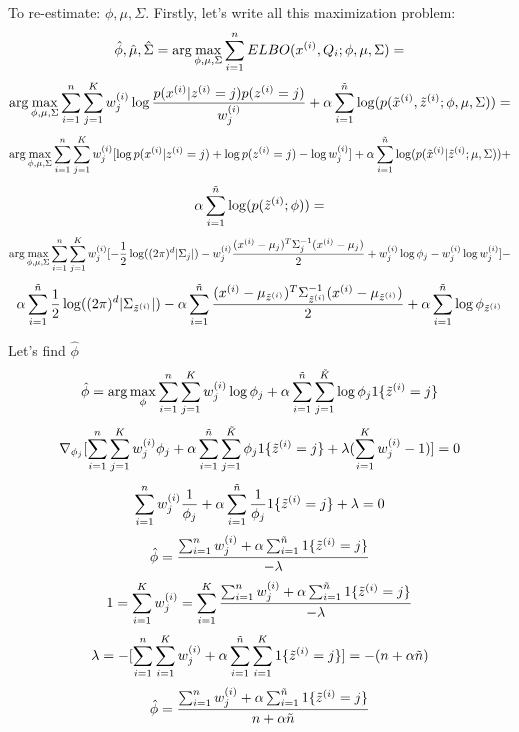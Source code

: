 \begin{answer}
To re-estimate: $\phi, \mu, \Sigma$.
Firstly, let's write all this maximization problem:
$$\hat{\phi},\hat{\mu},\hat{\Sigma} = \arg\max_{\phi, \mu, \Sigma} \sum_{i=1}^{{n}} ELBO(x^{(i)}, Q_i; \phi, \mu, \Sigma) = $$
$$ \arg\max_{\phi, \mu, \Sigma} \sum_{i=1}^{{n}} \sum_{j=1}^{K} w_j^{(i)} \log \frac{p(x^{(i)}|z^{(i)}=j)p(z^{(i)}=j)}{w_j^{(i)}} +  \alpha \sum_{i=1}^{\tilde{{n}}} \log(p(\tilde{x}^{(i)}, \tilde{z}^{(i)}; \phi, \mu, \Sigma)) = $$
$$\arg\max_{\phi, \mu, \Sigma} \sum_{i=1}^{{n}} \sum_{j=1}^{K} w_j^{(i)} [\log p(x^{(i)}|z^{(i)}=j) + \log p(z^{(i)}=j)  - \log w_j^{(i)}] +  \alpha \sum_{i=1}^{\tilde{{n}}} \log(p(\tilde{x}^{(i)} | \tilde{z}^{(i)}; \mu, \Sigma)) + $$
$$\alpha \sum_{i=1}^{\tilde{{n}}} \log(p(\tilde{z}^{(i)}; \phi)) = $$
$$\arg\max_{\phi, \mu, \Sigma} \sum_{i=1}^{{n}} \sum_{j=1}^{K} w_j^{(i)} [-\frac{1}{2}\log((2\pi)^{d} |\Sigma_j|) -  w_j^{(i)}\frac{(x^{(i)} - \mu_j)^T\Sigma_j^{-1}(x^{(i)} - \mu_j)}{2} + w_j^{(i)} \log \phi_j  -  w_j^{(i)}\log w_j^{(i)}] - $$
$$ \alpha \sum_{i=1}^{\tilde{{n}}} \frac{1}{2}\log((2\pi)^{d} |\Sigma_{\tilde{z}^{(i)}}|) - \alpha \sum_{i=1}^{\tilde{{n}}} \frac{(x^{(i)} - \mu_{\tilde{z}^{(i)}})^T\Sigma_{\tilde{z}^{(i)}}^{-1}(x^{(i)} - \mu_{\tilde{z}^{(i)}})}{2} + \alpha \sum_{i=1}^{\tilde{{n}}} \log \phi_{\tilde{z}^{(i)}}$$

Let's find $\hat{\phi}$
$$\hat{\phi} =  \arg\max_{\phi} \sum_{i=1}^{{n}} \sum_{j=1}^{K} w_j^{(i)} \log \phi_j +\alpha \sum_{i=1}^{\tilde{{n}}} \sum_{j=1}^{\tilde{K}}\log \phi_{j} 1\{\tilde{z}^{(i)}=j\}$$
$$\nabla_{\phi_j}[\sum_{i=1}^{{n}} \sum_{j=1}^{K} w_j^{(i)} \phi_j + \alpha \sum_{i=1}^{\tilde{{n}}} \sum_{j=1}^{\tilde{K}} \phi_{j} 1\{\tilde{z}^{(i)}=j\} + \lambda ( \sum_{i=1}^{K} w_j^{(i)} -1)] = 0$$
$$\sum_{i=1}^{{n}} w_j^{(i)} \frac{1}{\phi_j} +\alpha \sum_{i=1}^{\tilde{{n}}} \frac{1}{\phi_{j}} 1\{\tilde{z}^{(i)}=j\} + \lambda = 0$$
$$\hat{\phi} = \frac{\sum_{i=1}^{{n}} w_j^{(i)} +\alpha \sum_{i=1}^{\tilde{{n}}} 1\{\tilde{z}^{(i)}=j\}}{-\lambda}$$
$$1 = \sum_{i=1}^{K} w_j^{(i)}=\sum_{i=1}^{K} \frac{\sum_{i=1}^{{n}} w_j^{(i)} +\alpha \sum_{i=1}^{\tilde{{n}}} 1\{\tilde{z}^{(i)}=j\}}{-\lambda}$$
$$\lambda = -[\sum_{i=1}^{{n}} \sum_{i=1}^{K} w_j^{(i)} +\alpha \sum_{i=1}^{\tilde{{n}}} \sum_{i=1}^{K} 1\{\tilde{z}^{(i)}=j\}] = -(n  + \alpha \tilde{n})$$
$$\hat{\phi} = \frac{\sum_{i=1}^{{n}} w_j^{(i)} +\alpha \sum_{i=1}^{\tilde{{n}}} 1\{\tilde{z}^{(i)}=j\}}{n  + \alpha \tilde{n}}$$


\end{answer}
